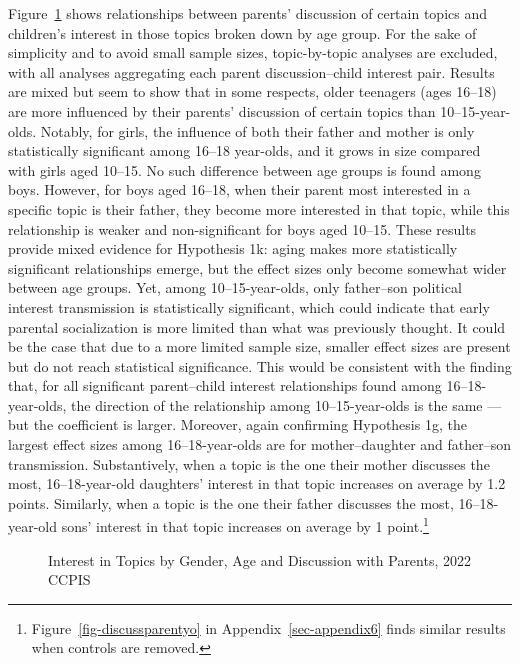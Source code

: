 \documentclass[
  letterpaper,
  DIV=11,
  numbers=noendperiod]{scrreprt}
\begin{document}
Figure~\ref{fig-discussparentyoctrl} shows relationships between
parents' discussion of certain topics and children's interest in those
topics broken down by age group. For the sake of simplicity and to avoid
small sample sizes, topic-by-topic analyses are excluded, with all
analyses aggregating each parent discussion--child interest pair.
Results are mixed but seem to show that in some respects, older
teenagers (ages 16--18) are more influenced by their parents' discussion
of certain topics than 10--15-year-olds. Notably, for girls, the
influence of both their father and mother is only statistically
significant among 16--18 year-olds, and it grows in size compared with
girls aged 10--15. No such difference between age groups is found among
boys. However, for boys aged 16--18, when their parent most interested
in a specific topic is their father, they become more interested in that
topic, while this relationship is weaker and non-significant for boys
aged 10--15. These results provide mixed evidence for Hypothesis 1k:
aging makes more statistically significant relationships emerge, but the
effect sizes only become somewhat wider between age groups. Yet, among
10--15-year-olds, only father--son political interest transmission is
statistically significant, which could indicate that early parental
socialization is more limited than what was previously thought. It could
be the case that due to a more limited sample size, smaller effect sizes
are present but do not reach statistical significance. This would be
consistent with the finding that, for all significant parent--child
interest relationships found among 16--18-year-olds, the direction of
the relationship among 10--15-year-olds is the same --- but the
coefficient is larger. Moreover, again confirming Hypothesis 1g, the
largest effect sizes among 16--18-year-olds are for mother--daughter and
father--son transmission. Substantively, when a topic is the one their
mother discusses the most, 16--18-year-old daughters' interest in that
topic increases on average by 1.2 points. Similarly, when a topic is the
one their father discusses the most, 16--18-year-old sons' interest in
that topic increases on average by 1 point.\footnote{Figure~\ref{fig-discussparentyo}
  in Appendix~\ref{sec-appendix6} finds similar results when controls
  are removed.}

\begin{figure}


\caption{\label{fig-discussparentyoctrl}Interest in Topics by Gender,
Age and Discussion with Parents, 2022 CCPIS}

\end{figure}%
\end{document}
